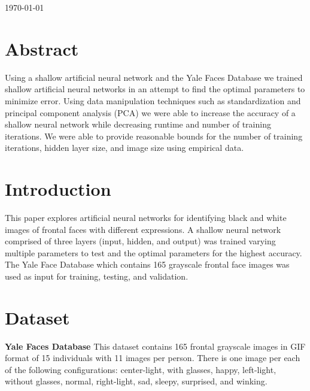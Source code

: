 \documentclass[12pt]{article}
\begin{document}
\begin{titlepage}

{\large \today}\\[3cm] %




\vfill %
\end{titlepage}

\newpage

\section{Abstract}
Using a shallow artificial neural network and the Yale Faces Database we trained shallow artificial neural networks in an attempt to find the optimal parameters to minimize error. Using data manipulation techniques such as standardization and principal component analysis (PCA) we were able to increase the accuracy of a shallow neural network while decreasing runtime and number of training iterations. We were able to provide reasonable bounds for the number of training iterations, hidden layer size, and image size using empirical data.


\section{Introduction}
This paper explores artificial neural networks for identifying black and white images of frontal faces with different expressions. A shallow neural network comprised of three layers (input, hidden, and output) was trained varying multiple parameters to test and the optimal parameters for the highest accuracy. The Yale Face Database which contains 165 grayscale frontal face images was used as input for training, testing, and validation.


\section{Dataset}
\textbf{Yale Faces Database} \quad This dataset contains 165 frontal grayscale images in GIF format of 15 individuals with 11 images per person. There is one image per each of the following configurations: center-light, with glasses, happy, left-light, without glasses, normal, right-light, sad, sleepy, surprised, and winking.
\end{document}
